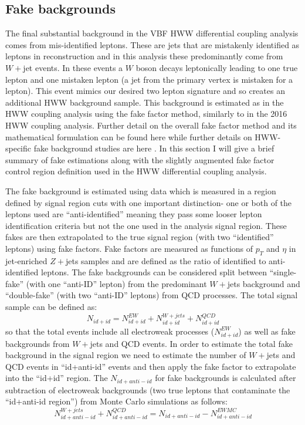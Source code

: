 \subsection{Fake backgrounds}
The final substantial background in the VBF HWW differential coupling analysis comes from mis-identified leptons. These are jets that are mistakenly identified as leptons in reconstruction and in this analysis these predominantly come from $W+$jet events. In these events a $W$ boson decays leptonically leading to one true lepton and one mistaken lepton (a jet from the primary vertex is mistaken for a lepton). This event mimics our desired two lepton signature and so creates an additional HWW background sample. This background is estimated as in the HWW coupling analysis using the fake factor method, similarly to in the 2016 HWW coupling analysis. Further detail on the overall fake factor method and its mathematical formulation can be found here \cite{fakefactormethod} while further details on HWW-specific fake background studies are here \cite{HWWCoupling}. In this section I will give a brief summary of fake estimations along with the slightly augmented fake factor control region definition used in the HWW differential coupling analysis. 

The fake background is estimated using data which is measured in a region defined by signal region cuts with one important distinction- one or both of the leptons used are ``anti-identified'' meaning they pass some looser lepton identification criteria but not the one used in the analysis signal region. These fakes are then extrapolated to the true signal region (with two ``identified'' leptons) using fake factors. Fake factors are measured as functions of $p_T$ and $\eta$ in jet-enriched $Z+$jets samples and are defined as the ratio of identified to anti-identified leptons. The fake backgrounds can be considered split between ``single-fake'' (with one ``anti-ID'' lepton) from the predominant $W+$jets background and ``double-fake'' (with two ``anti-ID'' leptons) from QCD processes. The total signal sample can be defined as: 
\begin{equation}
N_{id+id} = N^{EW}_{id+id}+N^{W+jets}_{id+id}+N^{QCD}_{id+id}
\end{equation} 
so that the total events include all electroweak processes ($N^{EW}_{id+id}$) as well as fake backgrounds from $W+$jets and QCD events. In order to estimate the total fake background in the signal region we need to estimate the number of $W+$jets and QCD events in ``id+anti-id'' events and then apply the fake factor to extrapolate into the ``id+id'' region. The $N_{id+anti-id}$ for fake backgrounds is calculated after subtraction of electroweak backgrounds (two true leptons that contaminate the ``id+anti-id region'') from Monte Carlo simulations as follows:
\begin{equation}
N^{W+jets}_{id+anti-id}+N^{QCD}_{id+anti-id}=N_{id+anti-id}-N^{EW MC}_{id+anti-id}
\end{equation}
 
